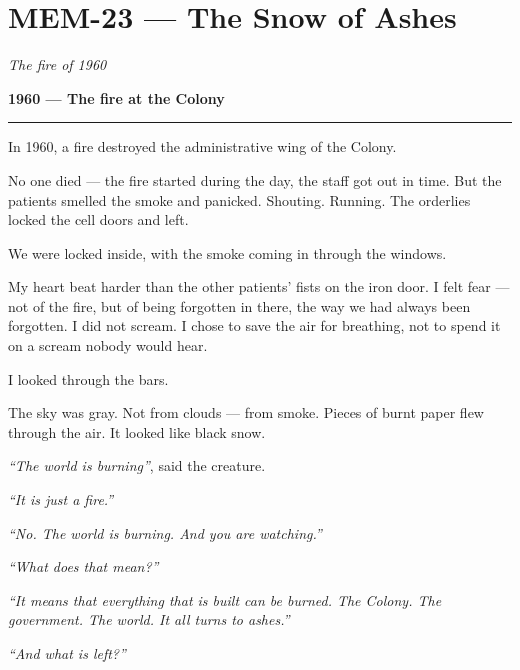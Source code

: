 \section*{\textbf{MEM-23} --- The Snow of Ashes}

\noindent \textit{The fire of 1960}

\noindent \textbf{1960 --- The fire at the Colony}

\vspace{0.5em}\noindent\rule{\textwidth}{0.5pt}\vspace{0.5em}

\noindent In 1960, a fire destroyed the administrative wing of the Colony.

\noindent No one died --- the fire started during the day, the staff got out in time. But the patients smelled the smoke and panicked. Shouting. Running. The orderlies locked the cell doors and left.

\noindent We were locked inside, with the smoke coming in through the windows.

\noindent My heart beat harder than the other patients' fists on the iron door. I felt fear --- not of the fire, but of being forgotten in there, the way we had always been forgotten. I did not scream. I chose to save the air for breathing, not to spend it on a scream nobody would hear.

\noindent I looked through the bars.

\noindent The sky was gray. Not from clouds --- from smoke. Pieces of burnt paper flew through the air. It looked like black snow.

\noindent \textit{\textquotedblleft{}The world is burning\textquotedblright{}}, said the creature.

\noindent \textit{\textquotedblleft{}It is just a fire.\textquotedblright{}}

\noindent \textit{\textquotedblleft{}No. The world is burning. And you are watching.\textquotedblright{}}

\noindent \textit{\textquotedblleft{}What does that mean?\textquotedblright{}}

\noindent \textit{\textquotedblleft{}It means that everything that is built can be burned. The Colony. The government. The world. It all turns to ashes.\textquotedblright{}}

\noindent \textit{\textquotedblleft{}And what is left?\textquotedblright{}}

